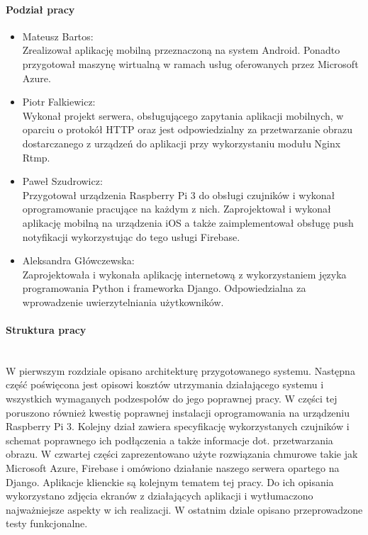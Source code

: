 \paragraph{Podział pracy}
\begin{itemize}
\item Mateusz Bartos: \\
Zrealizował aplikację mobilną przeznaczoną na system Android. Ponadto przygotował maszynę wirtualną w ramach usług oferowanych przez Microsoft Azure.
\item Piotr Falkiewicz: \\
Wykonał projekt serwera, obsługującego zapytania aplikacji mobilnych, w oparciu o protokół HTTP oraz jest odpowiedzialny za przetwarzanie obrazu dostarczanego z urządzeń do aplikacji przy wykorzystaniu modułu Nginx Rtmp. 
\item Paweł Szudrowicz: \\
Przygotował urządzenia Raspberry Pi 3 do obsługi czujników i wykonał oprogramowanie pracujące na każdym z nich. Zaprojektował i wykonał aplikację mobilną na urządzenia iOS a także zaimplementował obsługę push notyfikacji wykorzystując do tego usługi Firebase.
\item Aleksandra Główczewska: \\
Zaprojektowała i wykonała aplikację internetową z wykorzystaniem języka programowania Python i frameworka Django. Odpowiedzialna za wprowadzenie uwierzytelniania użytkowników.
\end{itemize}

\paragraph{Struktura pracy} \\
W pierwszym rozdziale opisano architekturę przygotowanego systemu. Następna część poświęcona jest opisowi kosztów utrzymania działającego systemu i wszystkich wymaganych podzespołów do jego poprawnej pracy. W części tej poruszono również kwestię poprawnej instalacji oprogramowania na urządzeniu Raspberry Pi 3. Kolejny dział zawiera specyfikację wykorzystanych czujników i schemat poprawnego ich podłączenia a także informacje dot. przetwarzania obrazu. W czwartej części zaprezentowano użyte rozwiązania chmurowe takie jak Microsoft Azure, Firebase i omówiono działanie naszego serwera opartego na Django. Aplikacje klienckie są kolejnym tematem tej pracy. Do ich opisania wykorzystano zdjęcia ekranów z działających aplikacji i wytłumaczono najważniejsze aspekty w ich realizacji. W ostatnim dziale opisano przeprowadzone testy funkcjonalne.